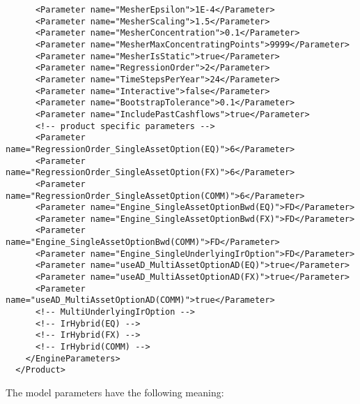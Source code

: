 \begin{verbatim}
      <Parameter name="MesherEpsilon">1E-4</Parameter>
      <Parameter name="MesherScaling">1.5</Parameter>
      <Parameter name="MesherConcentration">0.1</Parameter>
      <Parameter name="MesherMaxConcentratingPoints">9999</Parameter>
      <Parameter name="MesherIsStatic">true</Parameter>
      <Parameter name="RegressionOrder">2</Parameter>
      <Parameter name="TimeStepsPerYear">24</Parameter>
      <Parameter name="Interactive">false</Parameter>
      <Parameter name="BootstrapTolerance">0.1</Parameter>
      <Parameter name="IncludePastCashflows">true</Parameter>
      <!-- product specific parameters -->
      <Parameter name="RegressionOrder_SingleAssetOption(EQ)">6</Parameter>
      <Parameter name="RegressionOrder_SingleAssetOption(FX)">6</Parameter>
      <Parameter name="RegressionOrder_SingleAssetOption(COMM)">6</Parameter>
      <Parameter name="Engine_SingleAssetOptionBwd(EQ)">FD</Parameter>
      <Parameter name="Engine_SingleAssetOptionBwd(FX)">FD</Parameter>
      <Parameter name="Engine_SingleAssetOptionBwd(COMM)">FD</Parameter>
      <Parameter name="Engine_SingleUnderlyingIrOption">FD</Parameter>
      <Parameter name="useAD_MultiAssetOptionAD(EQ)">true</Parameter>
      <Parameter name="useAD_MultiAssetOptionAD(FX)">true</Parameter>
      <Parameter name="useAD_MultiAssetOptionAD(COMM)">true</Parameter>
      <!-- MultiUnderlyingIrOption -->
      <!-- IrHybrid(EQ) -->
      <!-- IrHybrid(FX) -->
      <!-- IrHybrid(COMM) -->
    </EngineParameters>
  </Product>
\end{verbatim}

The model parameters have the following meaning:

